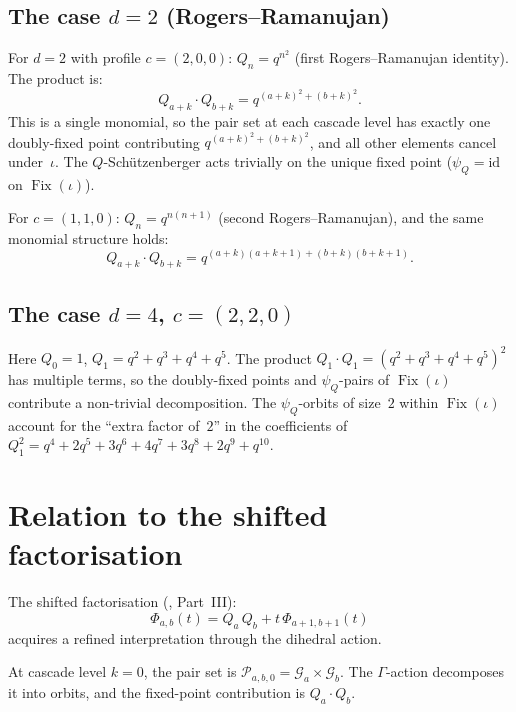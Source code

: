 \documentclass[11pt]{article}
\DeclareMathOperator{\Fix}{Fix}
\theoremstyle{plain}
\theoremstyle{definition}
\begin{document}
\subsection{The case $d = 2$ (Rogers--Ramanujan)}

For $d = 2$ with profile $c = (2, 0, 0)$:
$Q_n = q^{n^2}$ (first Rogers--Ramanujan identity).  The
product is:
\[
  Q_{a+k} \cdot Q_{b+k} = q^{(a+k)^2 + (b+k)^2}.
\]
This is a single monomial, so the pair set at each cascade
level has exactly one doubly-fixed point contributing
$q^{(a+k)^2 + (b+k)^2}$, and all other elements cancel
under~$\iota$.  The $Q$-Sch\"utzenberger acts trivially on the
unique fixed point ($\psi_Q = \mathrm{id}$ on $\Fix(\iota)$).

For $c = (1, 1, 0)$: $Q_n = q^{n(n+1)}$ (second
Rogers--Ramanujan), and the same monomial structure holds:
\[
  Q_{a+k} \cdot Q_{b+k} = q^{(a+k)(a+k+1) + (b+k)(b+k+1)}.
\]


\subsection{The case $d = 4$, $c = (2,2,0)$}

Here $Q_0 = 1$, $Q_1 = q^2 + q^3 + q^4 + q^5$.  The product
$Q_1 \cdot Q_1 = (q^2 + q^3 + q^4 + q^5)^2$ has multiple
terms, so the doubly-fixed points and $\psi_Q$-pairs of
$\Fix(\iota)$ contribute a non-trivial decomposition.  The
$\psi_Q$-orbits of size~$2$ within $\Fix(\iota)$ account for
the ``extra factor of~$2$'' in the coefficients of
$Q_1^2 = q^4 + 2q^5 + 3q^6 + 4q^7 + 3q^8 + 2q^9 + q^{10}$.


\section{Relation to the shifted factorisation}
\label{sec:shifted}

The shifted factorisation (\cite{ADJOINT}, Part~III):
\begin{equation}\label{eq:shifted}
  \Phi_{a,b}(t) = Q_a\, Q_b + t\, \Phi_{a+1,b+1}(t)
\end{equation}
acquires a refined interpretation through the dihedral action.

At cascade level $k = 0$, the pair set is
$\mathcal{P}_{a,b,0} = \mathcal{G}_a \times \mathcal{G}_b$.
The $\Gamma$-action decomposes it into orbits, and the
fixed-point contribution is $Q_a \cdot Q_b$.
\end{document}
